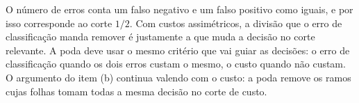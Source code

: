 \begin{solucao}
O número de erros conta um falso negativo e um falso positivo como iguais, e por isso
corresponde ao corte $1/2$. Com custos assimétricos, a divisão que o erro de classificação
manda remover é justamente a que muda a decisão no corte relevante. A poda deve usar o mesmo
critério que vai guiar as decisões: o erro de classificação quando os dois erros custam o
mesmo, o custo quando não custam. O argumento do item (b) continua valendo com o custo: a poda
remove os ramos cujas folhas tomam todas a mesma decisão no corte de custo.
\end{solucao}

